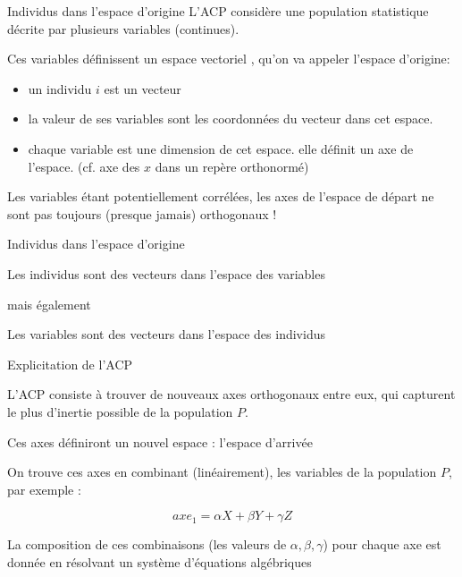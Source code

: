 \documentclass{beamer}
\begin{document}
\begin{frame}{Individus dans l'espace d'origine}
L'ACP considère une population statistique décrite par plusieurs variables (continues).


Ces variables définissent un \alert{espace vectoriel} , qu'on va appeler l'espace d'\alert{origine}: 
\begin{itemize}
	\item un individu $i$ est un \alert{vecteur}
	\item la valeur de ses variables sont les \alert{coordonnées} du vecteur dans cet espace. 
	\item chaque variable est une \alert{dimension} de cet espace. elle définit un \alert{axe} de l'espace. (cf. axe des $x$ dans un repère orthonormé)
\end{itemize}

Les variables étant potentiellement \alert{corrélées}, les axes de l'espace de départ ne sont pas toujours (presque jamais) orthogonaux ! 


\end{frame}


\begin{frame}{Individus dans l'espace d'origine}

Les individus sont des vecteurs dans l'espace des variables 


\medskip mais également \medskip

Les variables sont des vecteurs dans l'espace des individus 


\end{frame}





\begin{frame}{Explicitation de l'ACP}


L'ACP consiste à trouver de  \alert{nouveaux axes orthogonaux entre eux}, qui capturent le \alert{plus d'inertie possible} de la population $P$.


Ces axes définiront un nouvel espace : l'\alert{espace d'arrivée}


On trouve ces axes en combinant (linéairement), les variables de la population $P$, par exemple :

$$ axe_1 = \alpha X + \beta Y + \gamma Z $$ 

La composition de ces combinaisons (les valeurs de $\alpha, \beta, \gamma$) pour chaque axe est donnée en résolvant un système d'équations algébriques 
\end{frame}
\end{document}

